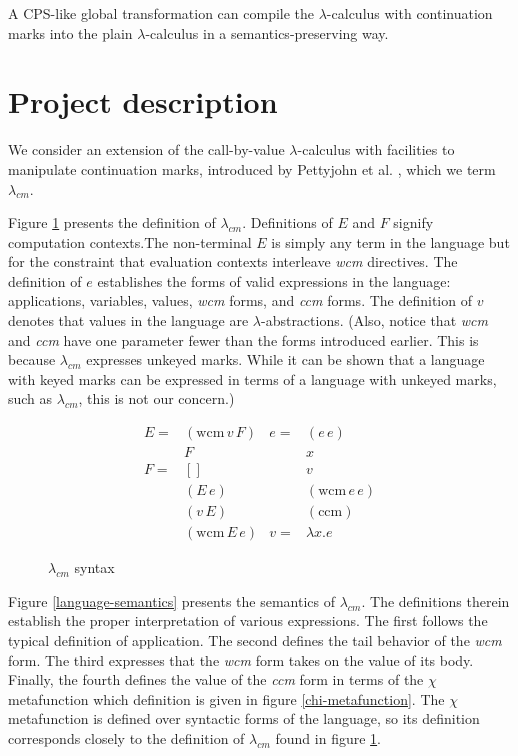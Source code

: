\documentclass[11pt,ms]{byuprop}
\newcounter{definition}
\begin{document}
A CPS-like global transformation can compile the $\lambda$-calculus with continuation
marks into the plain $\lambda$-calculus in a semantics-preserving way.

\section{Project description}

We consider an extension of the call-by-value $\lambda$-calculus with 
facilities to manipulate continuation marks, introduced by Pettyjohn et al. 
\cite{pettyjohn2005continuations}, which we term $\lambda_{cm}$.

Figure \ref{language-grammar} presents the definition of $\lambda_{cm}$. 
Definitions of $E$ and $F$ signify computation contexts.The non-terminal 
$E$ is simply any term in the language but for the constraint that evaluation 
contexts interleave \emph{wcm} directives. The definition of $e$ establishes 
the forms of valid expressions in the language: applications, variables, 
values, \emph{wcm} forms, and \emph{ccm} forms. The definition of $v$ denotes 
that values in the language are $\lambda$-abstractions. (Also, notice that 
\emph{wcm} and \emph{ccm} have one parameter fewer than the forms introduced 
earlier. This is because $\lambda_{cm}$ expresses unkeyed marks. While it can 
be shown that a language with keyed marks can be expressed in terms of a 
language with unkeyed marks, such as $\lambda_{cm}$, this is not our concern.) 

\begin{figure}
\begin{align*}
E = &(\mathrm{wcm}\,v\,F) & e = &(e\,e)\\
    &F                    &     &x\\
F = &[]                   &     &v\\
    &(E\,e)               &     &(\mathrm{wcm}\,e\,e)\\
    &(v\,E)               &     &(\mathrm{ccm})\\
    &(\mathrm{wcm}\,E\,e) & v = & \lambda x. e
\end{align*}
\caption{$\lambda_{cm}$ syntax}
\label{language-grammar}
\end{figure}

Figure \ref{language-semantics} presents the semantics of $\lambda_{cm}$. The 
definitions therein establish the proper interpretation of various expressions. 
The first follows the typical definition of application. The second defines 
the tail behavior of the \emph{wcm} form. The third expresses that the 
\emph{wcm} form takes on the value of its body. Finally, the fourth defines 
the value of the \emph{ccm} form in terms of the $\chi$ metafunction which 
definition is given in figure \ref{chi-metafunction}.
The $\chi$ metafunction is defined over syntactic forms of the language, so its 
definition corresponds closely to the definition of $\lambda_{cm}$ found in 
figure \ref{language-grammar}.
\end{document}
